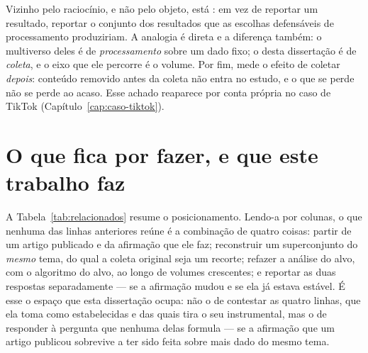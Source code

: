 Vizinho pelo raciocínio, e não pelo objeto, está
: em vez de reportar um resultado, reportar o conjunto
dos resultados que as escolhas defensáveis de processamento produziriam. A analogia é
direta e a diferença também: o multiverso deles é de \emph{processamento} sobre um dado
fixo; o desta dissertação é de \emph{coleta}, e o eixo que ele percorre é o volume.
Por fim,  mede o efeito de coletar \emph{depois}:
conteúdo removido antes da coleta não entra no estudo, e o que se perde não se perde ao
acaso. Esse achado reaparece por conta própria no caso de TikTok
(Capítulo~\ref{cap:caso-tiktok}).

\section{O que fica por fazer, e que este trabalho faz}
\label{sec:rel-lacuna}

A Tabela~\ref{tab:relacionados} resume o posicionamento. Lendo-a por colunas, o que
nenhuma das linhas anteriores reúne é a combinação de quatro coisas: partir de um
artigo publicado e da afirmação que ele faz; reconstruir um superconjunto do
\emph{mesmo} tema, do qual a coleta original seja um recorte; refazer a análise do
alvo, com o algoritmo do alvo, ao longo de volumes crescentes; e reportar as duas
respostas separadamente --- se a afirmação mudou e se ela já estava estável. É esse o
espaço que esta dissertação ocupa: não o de contestar as quatro linhas, que ela toma
como estabelecidas e das quais tira o seu instrumental, mas o de responder à pergunta
que nenhuma delas formula --- se a afirmação que um artigo publicou sobrevive a ter
sido feita sobre mais dado do mesmo tema.

